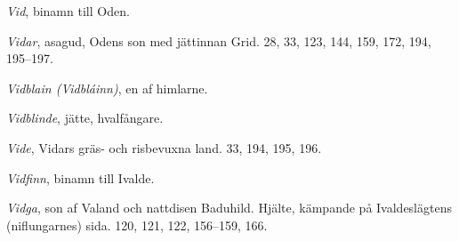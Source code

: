 \emph{Vid}, binamn till Oden.

\protect\hypertarget{lb1625905.xhtmlux5cux23start245}{}{}\protect\hypertarget{lb1625905.xhtmlux5cux23start245-a}{}{}\protect\hypertarget{lb1625905.xhtmlux5cux23start245-b}{}{}\protect\hypertarget{lb1625905.xhtmlux5cux23start245-c}{}{}\protect\hypertarget{lb1625905.xhtmlux5cux23start245-d}{}{}

\emph{Vidar}, asagud, Odens son med jättinnan Grid. 28, 33, 123, 144,
159, 172, 194, 195--197.

\emph{Vidblain (Vidbláinn)}, en af himlarne.

\emph{Vidblinde}, jätte, hvalfångare.

\emph{Vide}, Vidars gräs- och risbevuxna land. 33, 194, 195, 196.

\emph{Vidfinn}, binamn till Ivalde.

\emph{Vidga}, son af Valand och nattdisen Baduhild. Hjälte, kämpande på
Ivaldeslägtens (niflungarnes) sida. 120, 121, 122, 156--159, 166.

